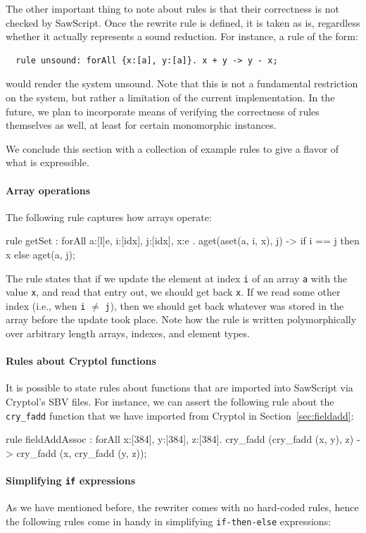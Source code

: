 \documentclass[12pt]{galois-whitepaper}
\newcommand{\sawScript}{{\sc SawScript}\xspace}
\begin{document}
The other important thing to note about rules is that their correctness is not checked by \sawScript. Once the rewrite rule is defined,
it is taken as is, regardless whether it actually represents a sound reduction. For instance, a rule of the form:
\begin{Verbatim}
  rule unsound: forAll {x:[a], y:[a]}. x + y -> y - x;
\end{Verbatim}
would render the system unsound. Note that this is not a fundamental restriction on the system, but rather a limitation of the current
implementation. In the future, we plan to incorporate means of verifying the correctness of rules themselves as well, at least for
certain monomorphic instances.

We conclude this section with a collection of example rules to give a flavor of what is expressible.

\paragraph{Array operations} The following rule captures how arrays operate:
\begin{code}
  rule getSet : forAll { a:[l]e, i:[idx], j:[idx], x:e }.
      aget(aset(a, i, x), j) -> if i == j then x else aget(a, j);
\end{code}
The rule states that if we update the element at index {\tt i} of an array {\tt a} with the value {\tt x}, and read that entry out,
we should get back {\tt x}. If we read some other index (i.e., when {\tt i} $\not=$ {\tt j}), then we should get back whatever
was stored in the array before the update took place.
Note how the rule is written polymorphically over arbitrary length arrays, indexes, and element types.

\paragraph{Rules about Cryptol functions} It is possible to state rules about functions that are
imported into \sawScript via Cryptol's SBV files. For instance, we can assert the following
rule about the {\tt cry\_fadd} function that we have imported from Cryptol in Section~\ref{sec:fieldadd}:

\begin{code}
  rule fieldAddAssoc : forAll {x:[384], y:[384], z:[384]}.
    cry_fadd (cry_fadd (x, y), z) -> cry_fadd (x, cry_fadd (y, z));
\end{code}

\paragraph{Simplifying {\tt if} expressions} As we have mentioned before, the rewriter comes with
no hard-coded rules, hence the following rules come in handy in simplifying {\tt if-then-else} expressions:
\end{document}
